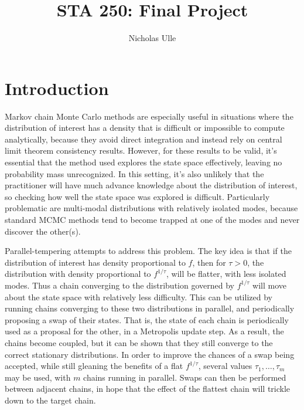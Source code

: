 

\pagestyle{name}
\title{STA 250: Final Project}
\author{Nicholas Ulle}

\captionsetup[sub]{font = scriptsize}


\maketitle
\clearpage
\chapter*{Introduction}
Markov chain Monte Carlo methods are especially useful in situations where
the distribution of interest has a density that is difficult or impossible to
compute analytically, because they avoid direct integration and
instead rely on central limit theorem consistency results.
However, for these results to be valid, it's essential that the method used
explores the state space effectively, leaving no probability mass unrecognized.
In this setting, it's also unlikely that the practitioner will have much 
advance knowledge about the distribution of interest, so checking how well
the state space was explored is difficult.
Particularly problematic are multi-modal distributions with relatively
isolated modes, because standard MCMC methods tend to become trapped at one
of the modes and never discover the other(s).

Parallel-tempering attempts to address this problem.
The key idea is that if the distribution of interest has density proportional
to $f$, then for $\tau > 0$, the distribution with density proportional to 
$f^{1/\tau}$, will be flatter, with less isolated modes.
Thus a chain converging to the distribution governed by $f^{1/\tau}$ will
move about the state space with relatively less difficulty.
This can be utilized by running chains converging to these two distributions
in parallel, and periodically proposing a swap of their states.
That is, the state of each chain is periodically used as a proposal for the 
other, in a Metropolis update step.
As a result, the chains become coupled, but it can be shown that they still
converge to the correct stationary distributions.
In order to improve the chances of a swap being accepted, while still gleaning
the benefits of a flat $f^{1/\tau}$, several values $\tau_1, \ldots, \tau_m$
may be used, with $m$ chains running in parallel. Swaps can then be performed
between adjacent chains, in hope that the effect of the flattest chain will
trickle down to the target chain.

